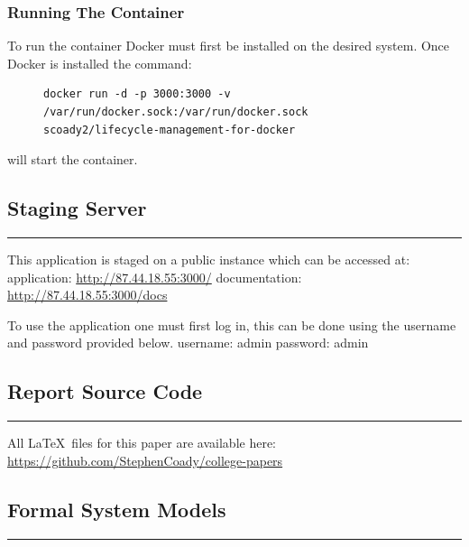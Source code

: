 \subsubsection{Running The Container}
To run the container Docker must first be installed on the desired system. Once Docker is installed the command: 
\begin{figure}[!ht]
\begin{lstlisting}
docker run -d -p 3000:3000 -v /var/run/docker.sock:/var/run/docker.sock scoady2/lifecycle-management-for-docker 
\end{lstlisting}
\end{figure}

will start the container.

\subsection{Staging Server} 
\label{appendix:staging}
\rule{\textwidth}{0.4pt}

This application is staged on a public instance which can be accessed at: \newline
application: \url{http://87.44.18.55:3000/} \newline
documentation: \url{http://87.44.18.55:3000/docs}

To use the application one must first log in, this can be done using the username and password provided below.\newline
username: admin \newline
password: admin

\subsection{Report Source Code} 
\label{appendix:reports}
\rule{\textwidth}{0.4pt}

All \LaTeX\  files for this paper are available here: \url{https://github.com/StephenCoady/college-papers}

\clearpage
\subsection{Formal System Models}
\label{appendix:models}
\rule{\textwidth}{0.4pt}

